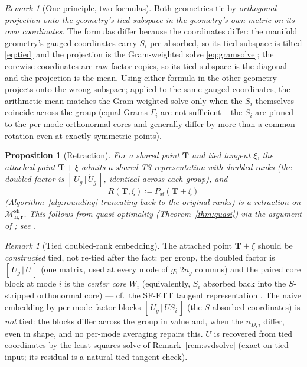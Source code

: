 \documentclass[11pt]{article}
\newtheorem{proposition}[theorem]{Proposition}
\theoremstyle{definition}
\theoremstyle{remark}
\newtheorem{remark}[theorem]{Remark}
\newcommand{\T}{\boldsymbol{T}}
\newcommand{\Msh}{\mathcal{M}^{\mathrm{sh}}_{\boldsymbol{n},\boldsymbol{r}}}
\begin{document}
\begin{remark}[One principle, two formulas]
Both geometries tie by \emph{orthogonal projection onto the geometry's tied
subspace in the geometry's own metric on its own coordinates}. The formulas
differ because the coordinates differ: the manifold geometry's gauged
coordinates carry $S_i$ pre-absorbed, so its tied subspace is tilted
\eqref{eq:tied} and the projection is the Gram-weighted solve
\eqref{eq:gramsolve}; the corewise coordinates are raw factor copies, so its
tied subspace is the diagonal and the projection is the mean. Using either
formula in the other geometry projects onto the wrong subspace; applied to
the same gauged coordinates, the arithmetic mean matches the Gram-weighted
solve only when the $S_i$ themselves coincide across the group (equal Grams
$\Gamma_i$ are not sufficient -- the $S_i$ are pinned to the per-mode
orthonormal cores and generally differ by more than a common rotation even
at exactly symmetric points).
\end{remark}

\begin{proposition}[Retraction]\label{prop:retract}
For a shared point $\T$ and tied tangent $\xi$, the attached point
$\T + \xi$ admits a shared T3 representation with doubled ranks (the doubled
factor is $[\,U_g \,|\, \dot U_g\,]$, identical across each group), and
\[
R(\T, \xi) \coloneqq P_{\mathrm{sf}}(\T + \xi)
\]
(Algorithm~\ref{alg:rounding} truncating back to the original ranks) is a
retraction on $\Msh$. This follows from quasi-optimality
(Theorem~\ref{thm:quasi}) via the argument of
\cite[Prop.~2.3]{KSV2014}; see \cite[Prop.~6]{MR2026}.
\end{proposition}

\begin{remark}[Tied doubled-rank embedding]\label{rem:embedding}
The attached point $\T + \xi$ should be \emph{constructed} tied, not re-tied
after the fact: per group, the doubled factor is $[\,U_g \,|\, \dot U\,]$
(one matrix, used at every mode of $g$; $2 n_g$ columns) and the paired core
block at mode $i$ is the \emph{center core} $W_i$ (equivalently, $S_i$
absorbed back into the $S$-stripped orthonormal core) --- cf.\ the SF-ETT
tangent representation \cite[\S 5.2]{MR2026}. The naive embedding by
per-mode factor blocks $[\,U_g \,|\, \dot U S_i\,]$ (the $S$-absorbed
coordinates) is \emph{not} tied: the blocks differ across the group in value
and, when the $n_{D,i}$ differ, even in shape, and no per-mode averaging
repairs this. $\dot U$ is recovered from tied coordinates by the
least-squares solve of Remark~\ref{rem:svdsolve} (exact on tied input; its
residual is a natural tied-tangent check).
\end{remark}
\end{document}
